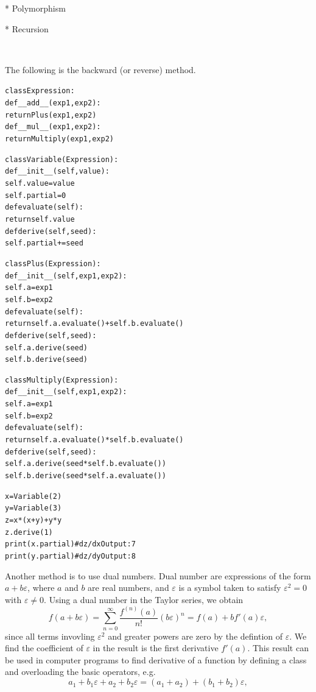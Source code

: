\documentclass{article}
\newenvironment{tmcode}[1][]{\begin{alltt} }{\end{alltt}}
\begin{document}
* Polymorphism

* Recursion

\

The following is the backward (or reverse) method.
\begin{tmcode}
class Expression:
    def __add__(exp1, exp2):
        return Plus(exp1,exp2)
    def __mul__(exp1, exp2):
        return Multiply(exp1, exp2)
        
class Variable(Expression):
    def __init__(self,value):
        self.value = value
        self.partial = 0
    def evaluate(self):
        return self.value
    def derive(self,seed):
        self.partial += seed

class Plus(Expression):
    def __init__(self,exp1,exp2):
        self.a = exp1
        self.b = exp2
    def evaluate(self):
        return self.a.evaluate() + self.b.evaluate()
    def derive(self,seed):
        self.a.derive(seed)
        self.b.derive(seed)
        
class Multiply(Expression):
    def __init__(self,exp1,exp2):
        self.a = exp1
        self.b = exp2
    def evaluate(self):
        return self.a.evaluate() * self.b.evaluate()
    def derive(self,seed):
        self.a.derive(seed * self.b.evaluate())
        self.b.derive(seed * self.a.evaluate())

x = Variable(2)
y = Variable(3)
z = x * (x + y) + y * y
z.derive(1)
print(x.partial)  # dz/dx Output:  7
print(y.partial)  # dz/dy Output:  8
\end{tmcode}
Another method is to use dual numbers. Dual number are expressions of the form
$a + b \varepsilon$, where $a$ and $b$ are real numbers, and $\varepsilon$ is
a symbol taken to satisfy $\varepsilon^2 = 0$ with $\varepsilon \neq 0$. Using
a dual number in the Taylor series, we obtain
\begin{equation}
  f (a + b \varepsilon) = \sum_{n = 0}^{\infty} \frac{f^{(n)} (a)}{n!} (b
  \varepsilon)^n = f (a) + b f' (a) \varepsilon,
\end{equation}
since all terms invovling $\varepsilon^2$ and greater powers are zero by the
defintion of $\varepsilon$. We find the coefficient of $\varepsilon$ in the
result is the first derivative $f' (a)$. This result can be used in computer
programs to find derivative of a function by defining a class and overloading
the basic operators, e.g.
\begin{equation}
  a_1 + b_1 \varepsilon + a_2 + b_2 \varepsilon = (a_1 + a_2) + (b_1 + b_2)
  \varepsilon,
\end{equation}
\end{document}
